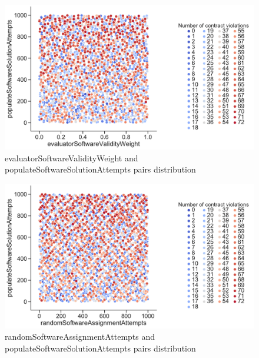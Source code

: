 \begin{figure}
	\centering
	\includegraphics[width=\textwidth]{images/PairsDistr/evaluatorSoftwareValidityWeight_populateSoftwareSolutionAttempts.pdf}
	\caption[evaluatorSoftwareValidityWeight and populateSoftwareSolutionAttempts pairs distribution]{evaluatorSoftwareValidityWeight and populateSoftwareSolutionAttempts pairs distribution}   
	\label{fig:evaluatorSoftwareValidityWeight_populateSoftwareSolutionAttempts_pair}
\end{figure}
\begin{figure}
	\centering
	\includegraphics[width=\textwidth]{images/PairsDistr/randomSoftwareAssignmentAttempts_populateSoftwareSolutionAttempts.pdf}
	\caption[randomSoftwareAssignmentAttempts and populateSoftwareSolutionAttempts pairs distribution]{randomSoftwareAssignmentAttempts and populateSoftwareSolutionAttempts pairs distribution} 
	\label{fig:randomSoftwareAssignmentAttempts_populateSoftwareSolutionAttempts_pair}
\end{figure}
